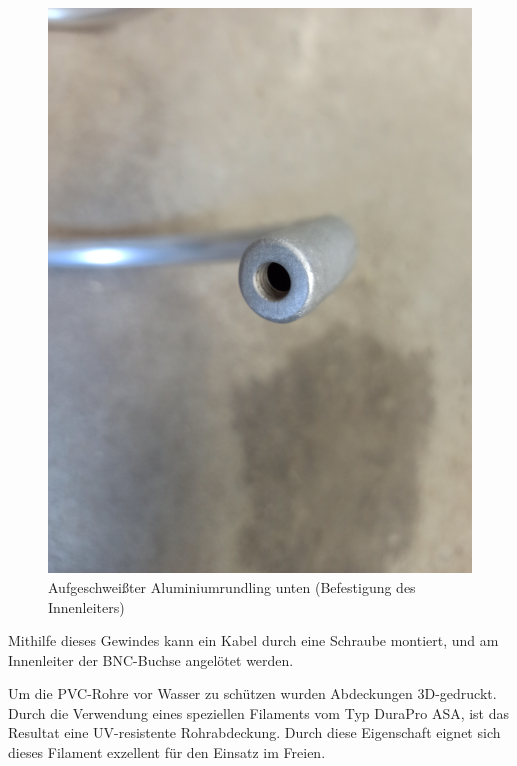 \begin{figure}[h!]
	\centering
	\includegraphics[width=\textwidth]{../ref/Anschluss-unten.jpg}
	\caption{Aufgeschweißter Aluminiumrundling unten (Befestigung des Innenleiters)}
	\label{fig:Deckel-Helix-Unten}
\end{figure}

Mithilfe dieses Gewindes kann ein Kabel durch eine Schraube montiert, und am Innenleiter der BNC-Buchse angelötet werden.

Um die PVC-Rohre vor Wasser zu schützen wurden Abdeckungen 3D-gedruckt. Durch die Verwendung eines speziellen Filaments vom Typ DuraPro ASA, ist das Resultat eine UV-resistente Rohrabdeckung. Durch diese Eigenschaft eignet sich dieses Filament exzellent für den Einsatz im Freien.

